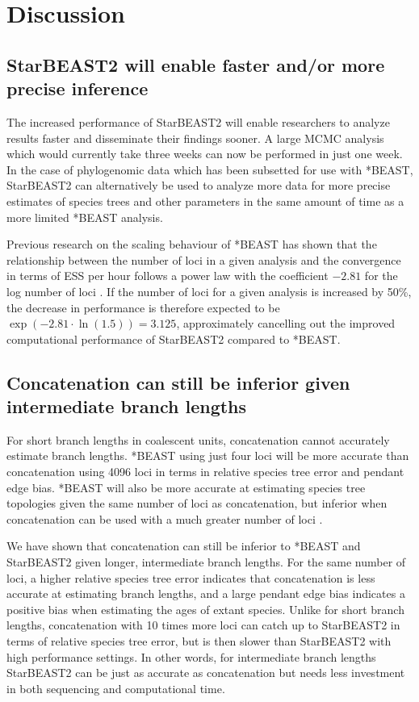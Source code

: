 \documentclass[nogrid]{MBE}%
\begin{document}
\section{Discussion}

\subsection{StarBEAST2 will enable faster and/or more precise inference}

The increased performance of StarBEAST2 will enable researchers to analyze
results faster and disseminate their findings sooner. A large MCMC analysis
which would currently take three weeks can now be performed in just one week. In
the case of phylogenomic data which has been subsetted for use with *BEAST,
StarBEAST2 can alternatively be used to analyze more data for more precise
estimates of species trees and other parameters in the same amount of time as a
more limited *BEAST analysis.

Previous research on the scaling behaviour of *BEAST has shown that the
relationship between the number of loci in a given analysis and the convergence
in terms of ESS per hour follows a power law with the coefficient $-2.81$ for
the log number of loci \citep{Ogilvie01052016}. If the number of loci for a
given analysis is increased by 50\%, the decrease in performance is therefore
expected to be $\exp(-2.81 \cdot \ln(1.5)) = 3.125$, approximately cancelling
out the improved computational performance of StarBEAST2 compared to *BEAST.

\subsection{Concatenation can still be inferior given intermediate branch lengths}

For short branch lengths in coalescent units, concatenation cannot accurately
estimate branch lengths. *BEAST using just four loci will be more accurate than
concatenation using 4096 loci in terms in relative species tree error and
pendant edge bias. *BEAST will also be more accurate at estimating species tree
topologies given the same number of loci as concatenation, but inferior when
concatenation can be used with a much greater number of loci
\citep{Ogilvie01052016}.

We have shown that concatenation can still be inferior to *BEAST and StarBEAST2
given longer, intermediate branch lengths. For the same number of loci, a higher
relative species tree error indicates that concatenation is less accurate at
estimating branch lengths, and a large pendant edge bias indicates a positive
bias when estimating the ages of extant species. Unlike for short branch
lengths, concatenation with 10 times more loci can catch up to StarBEAST2 in
terms of relative species tree error, but is then slower than StarBEAST2 with
high performance settings. In other words, for intermediate branch lengths StarBEAST2
can be just as accurate as concatenation but needs less investment in both
sequencing and computational time.
\end{document}
